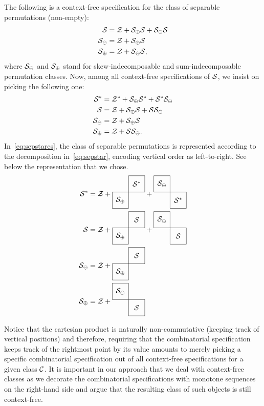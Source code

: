 \documentclass[12pt, a4paper, twoside]{report}
\begin{document}
\begin{example}
  The following is a context-free specification for the class of separable permutations (non-empty):
  \begin{align*}
    \S &= \Z + \S_{\oplus}\S + \S_{\ominus}\S\\
    \S_{\ominus} &= \Z + \S_\oplus\S\\
    \S_\oplus &= \Z + \S_\ominus\S,
  \end{align*}
  where $\S_\ominus$ and $\S_\oplus$ stand for skew-indecomposable and sum-indecomposable permutation classes. Now, among all context-free specifications of $\S$, we insist on picking the following one:
  \begin{align}
    \begin{aligned}
    \S^* &= \Z^* + \S_{\oplus}\S^* + \S^*\S_{\ominus}\\
    \S &= \Z + \S_{\oplus}\S + \S\S_{\ominus}\\
    \S_{\ominus} &= \Z + \S_\oplus\S\\
    \S_\oplus &= \Z + \S\S_\ominus.
    \label{eq:sepstarcs}
  \end{aligned}
  \end{align}
  In~\eqref{eq:sepstarcs}, the class of separable permutations is represented according to the decomposition in~\eqref{eq:sepstar}, encoding vertical order as left-to-right. See below the representation that we chose.
  \begin{align}
    \begin{aligned}
      \S^* &= \Z + \cplusc{\S_\oplus}{\S^*} + \cminusc{\S^*}{\S_\ominus}\\
      \S &= \Z + \cplusc{\S_\oplus}{\S} + \cminusc{\S}{\S_\ominus}\\
      \S_\ominus &= \Z + \cplusc{\S_\oplus}{\S}\\
      \S_\oplus &= \Z + \cminusc{\S}{\S_\ominus}
    \label{eq:sepstar}
  \end{aligned}
  \end{align}
\end{example}
Notice that the cartesian product is naturally non-commutative (keeping track of vertical positions) and therefore, requiring that the combinatorial specification keeps track of the rightmost point by its value amounts to merely picking a specific combinatorial specification out of all context-free specifications for a given class $\C$. It is important in our approach that we deal with context-free classes as we decorate the combinatorial specifications with monotone sequences on the right-hand side and argue that the resulting class of such objects is still context-free.
\end{document}
